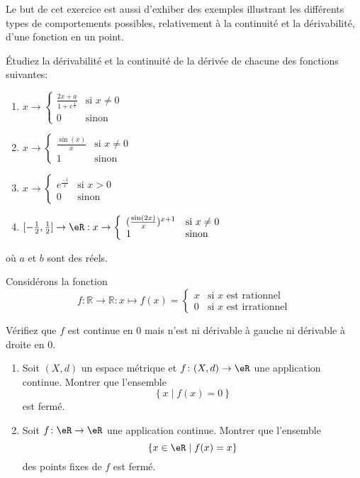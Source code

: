 Le but de cet exercice est aussi d'exhiber des exemples illustrant les
différents types de comportements possibles, relativement à la
continuité et la dérivabilité, d'une fonction en un point.

\exerNico Étudiez la dérivabilité et la continuité
de la dérivée de chacune des fonctions suivantes:
\begin{enumerate}
	\item $ x \rightarrow
		      \left\{ \begin{array}{ll}
			      \frac{2x+a}{1+e^{\frac{1}{x}}} & \mbox{si } x \not= 0 \\
			      0                              & \mbox{sinon}
		      \end{array} \right.$
	\item $ x \rightarrow
		      \left\{ \begin{array}{ll}
			      \frac{\sin(x)}{x} & \mbox{si } x \not= 0 \\
			      1                 & \mbox{sinon}
		      \end{array} \right.$
	\item $ x \rightarrow
		      \left\{ \begin{array}{ll}
			      e^{\frac{-1}{x}} & \mbox{si } x > 0 \\
			      0                & \mbox{sinon}
		      \end{array} \right.$
	\item $ [-\frac{1}{2}, \frac{1}{2}] \rightarrow \eR: x \rightarrow
		      \left\{ \begin{array}{ll}
			      (\frac{\sin(2x)}{x})^{x+1} & \mbox{si } x \not= 0 \\
			      1                          & \mbox{sinon}
		      \end{array} \right.$
\end{enumerate}
où $a$ et $b$ sont des réels.


\exerNico Considérons la fonction
$$f:\mathbb{R}\rightarrow\mathbb{R}:x\mapsto f(x)=\left\{
	\begin{array}{ll}
		x & \text{si }x\text{ est rationnel}   \\
		0 & \text{si }x\text{ est irrationnel}
	\end{array}
	\right.$$

Vérifiez que $f$ est continue en $0$ mais n'est ni dérivable à  gauche ni dérivable à droite en
$0$.

\exerNico
\begin{enumerate}
	\item Soit $(X,d)$ un espace métrique et $f \colon (X,d) \to \eR$ une application continue.
	      Montrer que l'ensemble $$\left\{ x \mid f(x) = 0 \right\}$$ est fermé.

	\item Soit $f \colon \eR \to \eR$ une application continue.
	      Montrer que l'ensemble
	      $$
		      \{ x \in \eR \mid f(x) = x\}
	      $$
	      des points fixes de $f$ est fermé.

\end{enumerate}

